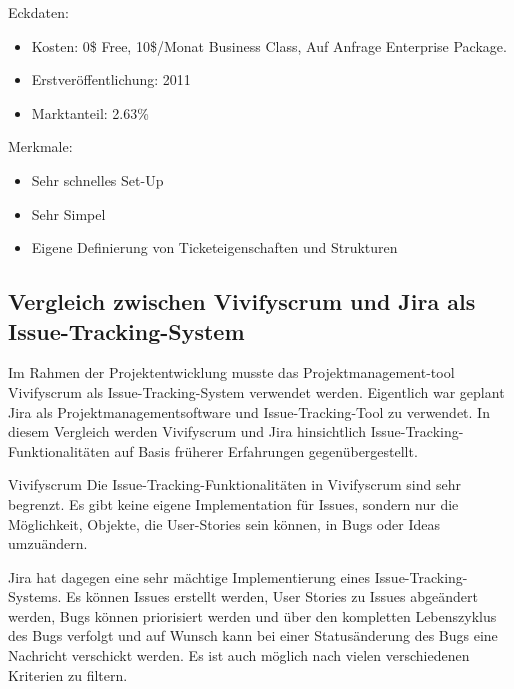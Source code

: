Eckdaten:
\begin{itemize}
	\item Kosten: 0\$ Free, 10\$/Monat Business Class, Auf Anfrage Enterprise Package.
	\item Erstveröffentlichung: 2011
	\item Marktanteil: 2.63\%
\end{itemize}		
Merkmale:
\begin{itemize}
	\item Sehr schnelles Set-Up
	\item Sehr Simpel
	\item Eigene Definierung von Ticketeigenschaften und Strukturen
\end{itemize}			
\subsection{Vergleich zwischen Vivifyscrum und Jira als Issue-Tracking-System}
Im Rahmen der Projektentwicklung musste das Projektmanagement-tool Vivifyscrum als Issue-Tracking-System verwendet werden. Eigentlich war geplant Jira als Projektmanagementsoftware und Issue-Tracking-Tool zu verwendet. In diesem Vergleich werden Vivifyscrum und Jira hinsichtlich Issue-Tracking-Funktionalitäten auf Basis früherer Erfahrungen gegenübergestellt. 

Vivifyscrum
Die Issue-Tracking-Funktionalitäten in Vivifyscrum sind sehr begrenzt. Es gibt keine eigene Implementation für Issues, sondern nur die Möglichkeit, Objekte, die User-Stories sein können, in Bugs oder Ideas umzuändern.

Jira hat dagegen eine sehr mächtige Implementierung eines Issue-Tracking-Systems. Es können Issues erstellt werden, User Stories zu Issues abgeändert werden, Bugs können priorisiert werden und über den kompletten Lebenszyklus des Bugs verfolgt und auf Wunsch kann bei einer Statusänderung des Bugs eine Nachricht verschickt werden. Es ist auch möglich nach vielen verschiedenen Kriterien zu filtern.  